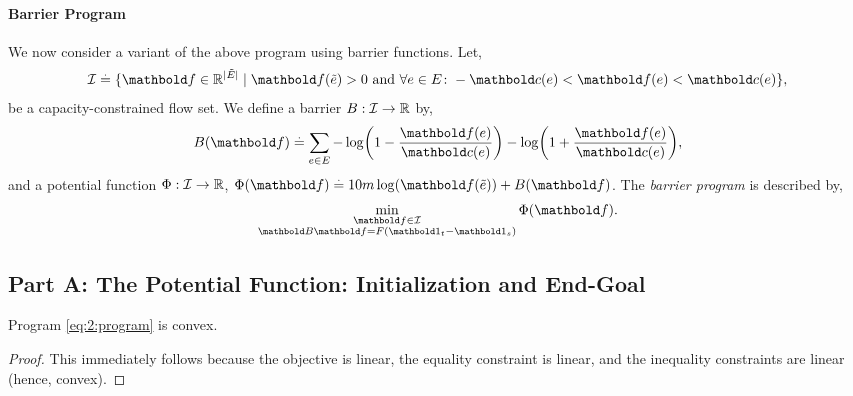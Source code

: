 \documentclass{tufte-handout}
\newcommand{\Etil}{\Tilde{E}}
\newcommand{\etil}{\Tilde{e}}
\newcommand{\barrierflowset}{\mathcal{I}}
\begin{document}
\paragraph{Barrier Program} We now consider a variant of the above program using barrier functions. Let, \begin{align*}
    \barrierflowset \defeq \{\vf \in \R^{|\Etil|} \mid \text{$\vf(\etil) > 0$ and $\forall e \in E \colon -\vc(e) < \vf(e) < \vc(e)$}\},
\end{align*} be a capacity-constrained flow set. We define a barrier $B: \barrierflowset \to \R$ by, \begin{align*}
    B(\vf) \defeq \sum_{e \in E} - \log\parentheses*{1 - \frac{\vf(e)}{\vc(e)}} - \log\parentheses*{1 + \frac{\vf(e)}{\vc(e)}},
\end{align*} and a potential function $\Phi : \barrierflowset \to \R$, $\Phi(\vf) \defeq 10 m \log(\vf(\etil)) + B(\vf)$. The \emph{barrier program} is described by, \begin{align}
    \min_{\substack{\vf \in \barrierflowset \\ \mB\vf = F(\vOne_t - \vOne_s)}} \Phi(\vf). \label{eq:2:barrier_program}
\end{align}

\subsection{Part A: The Potential Function: Initialization and End-Goal}

\begin{lem}
Program \eqref{eq:2:program} is convex.
\end{lem}
\begin{proof}
This immediately follows because the objective is linear, the equality constraint is linear, and the inequality constraints are linear (hence, convex).
\end{proof}
\end{document}
